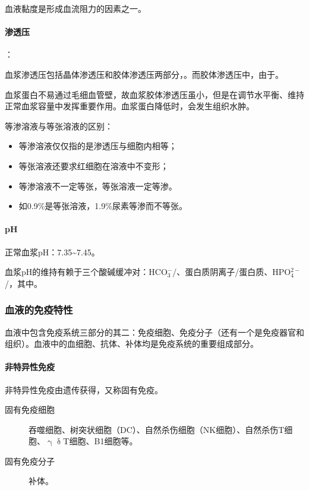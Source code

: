 血液黏度是形成血流阻力的因素之一。

\paragraph{渗透压}

：

血浆渗透压包括晶体渗透压和胶体渗透压两部分，。而胶体渗透压中，由于。

血浆蛋白不易通过毛细血管壁，故血浆胶体渗透压虽小，但是在调节水平衡、维持正常血浆容量中发挥重要作用。血浆蛋白降低时，会发生组织水肿。

等渗溶液与等张溶液的区别：
\begin{itemize}
	\item 等渗溶液仅仅指的是渗透压与细胞内相等；
	\item 等张溶液还要求红细胞在溶液中不变形；
	\item 等渗溶液不一定等张，等张溶液一定等渗。
	\item 如0.9\%是等张溶液，1.9\%尿素等渗而不等张。
\end{itemize}

\paragraph{pH}

正常血浆pH：7.35\textasciitilde7.45。

血浆pH的维持有赖于三个酸碱缓冲对：HCO$_{3}^{-}$/、蛋白质阴离子/蛋白质、HPO$_{4}^{2-}$/，其中。

\subsubsection{血液的免疫特性}

血液中包含免疫系统三部分的其二：免疫细胞、免疫分子（还有一个是免疫器官和组织）。血液中的血细胞、抗体、补体均是免疫系统的重要组成部分。

\paragraph{非特异性免疫}

非特异性免疫由遗传获得，又称固有免疫。

\begin{description}
	\item[固有免疫细胞] 吞噬细胞、树突状细胞（DC）、自然杀伤细胞（NK细胞）、自然杀伤T细胞、$\upgamma\updelta$T细胞、B1细胞等。
	\item[固有免疫分子] 补体。
\end{description}

